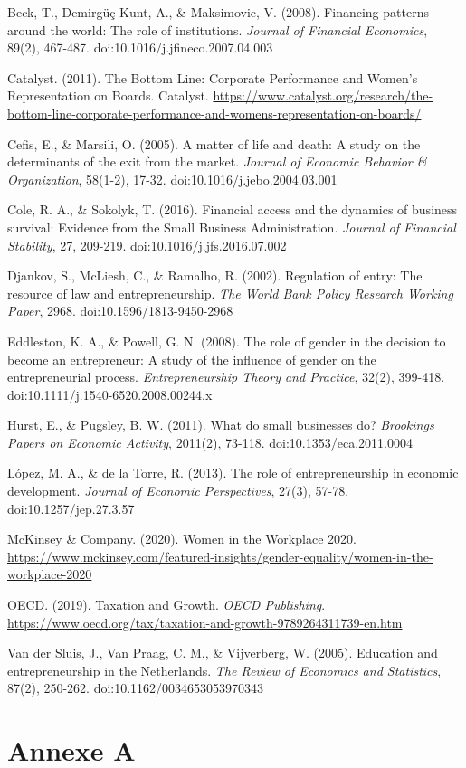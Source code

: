 \documentclass[a4paper,12pt]{report}
\begin{document}
\begin{thebibliography}{99}

Beck, T., Demirgüç-Kunt, A., \& Maksimovic, V. (2008). Financing patterns around the world: The role of institutions. \textit{Journal of Financial Economics}, 89(2), 467-487. doi:10.1016/j.jfineco.2007.04.003

Catalyst. (2011). The Bottom Line: Corporate Performance and Women's Representation on Boards. Catalyst. \url{https://www.catalyst.org/research/the-bottom-line-corporate-performance-and-womens-representation-on-boards/}

Cefis, E., \& Marsili, O. (2005). A matter of life and death: A study on the determinants of the exit from the market. \textit{Journal of Economic Behavior \& Organization}, 58(1-2), 17-32. doi:10.1016/j.jebo.2004.03.001

Cole, R. A., \& Sokolyk, T. (2016). Financial access and the dynamics of business survival: Evidence from the Small Business Administration. \textit{Journal of Financial Stability}, 27, 209-219. doi:10.1016/j.jfs.2016.07.002

Djankov, S., McLiesh, C., \& Ramalho, R. (2002). Regulation of entry: The resource of law and entrepreneurship. \textit{The World Bank Policy Research Working Paper}, 2968. doi:10.1596/1813-9450-2968

Eddleston, K. A., \& Powell, G. N. (2008). The role of gender in the decision to become an entrepreneur: A study of the influence of gender on the entrepreneurial process. \textit{Entrepreneurship Theory and Practice}, 32(2), 399-418. doi:10.1111/j.1540-6520.2008.00244.x

Hurst, E., \& Pugsley, B. W. (2011). What do small businesses do? \textit{Brookings Papers on Economic Activity}, 2011(2), 73-118. doi:10.1353/eca.2011.0004

López, M. A., \& de la Torre, R. (2013). The role of entrepreneurship in economic development. \textit{Journal of Economic Perspectives}, 27(3), 57-78. doi:10.1257/jep.27.3.57

McKinsey \& Company. (2020). Women in the Workplace 2020. \url{https://www.mckinsey.com/featured-insights/gender-equality/women-in-the-workplace-2020}

OECD. (2019). Taxation and Growth. \textit{OECD Publishing}. \url{https://www.oecd.org/tax/taxation-and-growth-9789264311739-en.htm}

Van der Sluis, J., Van Praag, C. M., \& Vijverberg, W. (2005). Education and entrepreneurship in the Netherlands. \textit{The Review of Economics and Statistics}, 87(2), 250-262. doi:10.1162/0034653053970343

\end{thebibliography}


\appendix
\chapter{Annexe A}
\end{document}
